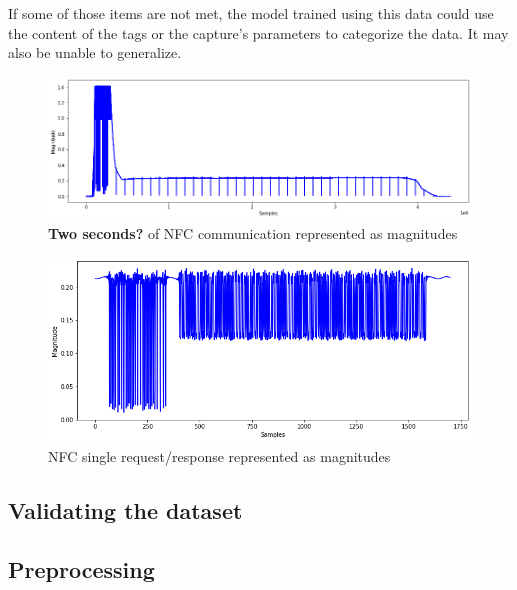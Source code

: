 If some of those items are not met, the model trained using this data could use the content of the tags or the capture's parameters to categorize the data. It may also be unable to generalize.

\begin{figure}[htp!]
  \centering
  \includegraphics[scale=0.47]{figures/data_whole-transmission.png}
  \caption{\textbf{Two seconds?} of NFC communication represented as magnitudes}
  \label{fig:nfc-full}
\end{figure}

\begin{figure}[htp!]
  \centering
  \includegraphics[scale=0.55]{figures/data_single-request-response.png}
  \caption{NFC single request/response represented as magnitudes}
  \label{fig:nfc-single}
\end{figure}

\subsection{Validating the dataset}

\subsection{Preprocessing}
